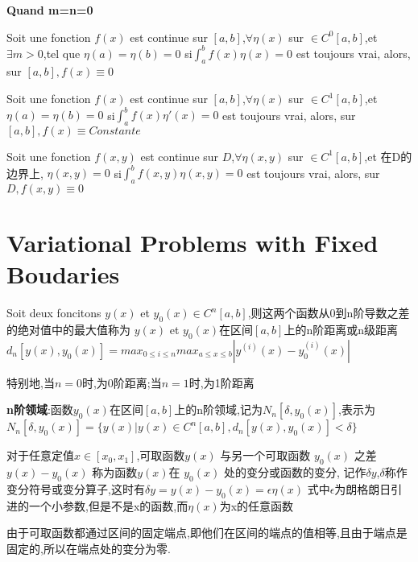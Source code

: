 \documentclass{book}
\begin{document}
\textbf{Quand m=n=0}
\begin{theorem}
Soit une fonction $f(x)$ est continue sur $[a,b]$,$ \forall \eta(x)$ sur $\in C^{0}[a,b]$,et $\exists m>0$,tel que $\eta(a)=\eta(b)=0$ \newline
si$ \int_{a}^{b}f(x)\eta(x)=0$ est toujours vrai, \newline
alors, sur $[a,b],f(x)\equiv 0$
\end{theorem}

\begin{theorem}
Soit une fonction $f(x)$ est continue sur $[a,b]$,$ \forall \eta(x)$ sur $\in C^{1}[a,b]$,et $\eta(a)=\eta(b)=0$ \newline
si$ \int_{a}^{b}f(x)\eta'(x)=0$ est toujours vrai, \newline
alors, sur $[a,b],f(x)\equiv Constante$
\end{theorem}

\begin{theorem}
Soit une fonction $f(x,y)$ est continue sur $D$,$ \forall \eta(x,y)$ sur $\in C^{1}[a,b]$,et 在D的边界上, $\eta(x,y)=0$\newline
si$ \int_{a}^{b}f(x,y)\eta(x,y)=0$ est toujours vrai, \newline
alors, sur $D,f(x,y)\equiv 0$
\end{theorem}

\section{Variational Problems with Fixed Boudaries}
\begin{definition}[n阶距离]
Soit deux foncitons $y(x)$ et $y_0(x)\in C^{n}[a,b]$,则这两个函数从0到n阶导数之差的绝对值中的最大值称为 $y(x)$ et $y_0(x)$在区间$[a,b]$上的n阶距离或n级距离
$d_n[y(x),y_0(x)]=max_{0 \leqslant i \leqslant n}max_{a \leqslant x \leqslant b}|y^{(i)}(x)-y_0^{(i)}(x)|$
\end{definition}
特别地,当$n=0$时,为0阶距离;当$n=1$时,为1阶距离

\begin{definition}
\textbf{n阶领域}:函数$y_0(x)$在区间$[a,b]$上的n阶领域,记为$N_n[\delta,y_0(x)]$,表示为\newline
$N_n[\delta,y_0(x)]=\{y(x)|y(x)\in C^{n}[a,b],d_n[y(x),y_0(x)] < \delta \}$
\end{definition}
\begin{definition}[变分]
对于任意定值$x \in [x_0,x_1]$,可取函数$y(x)$ 与另一个可取函数 $y_0(x)$ 之差$y(x)-y_0(x)$ 称为函数$y(x)$在 $y_0(x)$ 处的变分或函数的变分,
记作$\delta y$,$\delta$称作变分符号或变分算子,这时有$\delta y=y(x)-y_0(x)=\epsilon\eta(x)$ \newline
式中$\epsilon$为朗格朗日引进的一个小参数,但是不是x的函数,而$\eta(x)$为x的任意函数
\end{definition}
由于可取函数都通过区间的固定端点,即他们在区间的端点的值相等,且由于端点是固定的,所以在端点处的变分为零.
\end{document}
